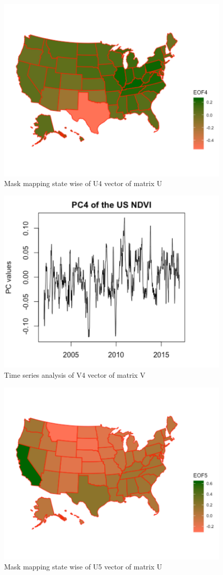     
     \begin{figure}[H]
            \centering
            \includegraphics[width=0.70\linewidth]{figures/ch5/SVD/eof4.png}
            \caption{\label{fig:EOF_4} Mask mapping state wise of U4 vector of matrix U}
    \end{figure}
    
     \begin{figure}[H]
            \centering
            \includegraphics[width=0.70\linewidth]{figures/ch5/SVD/pc4.png}
            \caption{\label{fig:V_4} Time series analysis of V4 vector of matrix V}
    \end{figure}
    
    
     \begin{figure}[H]
            \centering
            \includegraphics[width=0.70\linewidth]{figures/ch5/SVD/eof5.png}
            \caption{\label{fig:EOF_5} Mask mapping state wise of U5 vector of matrix U}
    \end{figure}
    
